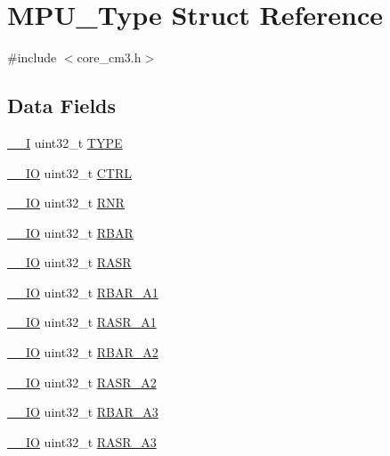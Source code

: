 \hypertarget{structMPU__Type}{}\section{M\+P\+U\+\_\+\+Type Struct Reference}
\label{structMPU__Type}


{\ttfamily \#include $<$core\+\_\+cm3.\+h$>$}

\subsection*{Data Fields}
\begin{DoxyCompactItemize}
\item 
\hyperlink{LPC17xx_8h_af63697ed9952cc71e1225efe205f6cd3}{\+\_\+\+\_\+I} uint32\+\_\+t \hyperlink{structMPU__Type_a6ae8a8c3a4909ae41447168d793608f7}{T\+Y\+PE}
\item 
\hyperlink{LPC17xx_8h_aec43007d9998a0a0e01faede4133d6be}{\+\_\+\+\_\+\+IO} uint32\+\_\+t \hyperlink{structMPU__Type_aab33593671948b93b1c0908d78779328}{C\+T\+RL}
\item 
\hyperlink{LPC17xx_8h_aec43007d9998a0a0e01faede4133d6be}{\+\_\+\+\_\+\+IO} uint32\+\_\+t \hyperlink{structMPU__Type_afd8de96a5d574c3953e2106e782f9833}{R\+NR}
\item 
\hyperlink{LPC17xx_8h_aec43007d9998a0a0e01faede4133d6be}{\+\_\+\+\_\+\+IO} uint32\+\_\+t \hyperlink{structMPU__Type_a3f2e2448a77aadacd9f394f6c4c708d9}{R\+B\+AR}
\item 
\hyperlink{LPC17xx_8h_aec43007d9998a0a0e01faede4133d6be}{\+\_\+\+\_\+\+IO} uint32\+\_\+t \hyperlink{structMPU__Type_adc65d266d15ce9ba57b3d127e8267f03}{R\+A\+SR}
\item 
\hyperlink{LPC17xx_8h_aec43007d9998a0a0e01faede4133d6be}{\+\_\+\+\_\+\+IO} uint32\+\_\+t \hyperlink{structMPU__Type_a4dbcffa0a71c31e521b645b34b40e639}{R\+B\+A\+R\+\_\+\+A1}
\item 
\hyperlink{LPC17xx_8h_aec43007d9998a0a0e01faede4133d6be}{\+\_\+\+\_\+\+IO} uint32\+\_\+t \hyperlink{structMPU__Type_a94222f9a8637b5329016e18f08af7185}{R\+A\+S\+R\+\_\+\+A1}
\item 
\hyperlink{LPC17xx_8h_aec43007d9998a0a0e01faede4133d6be}{\+\_\+\+\_\+\+IO} uint32\+\_\+t \hyperlink{structMPU__Type_a8703a00626dba046b841c0db6c78c395}{R\+B\+A\+R\+\_\+\+A2}
\item 
\hyperlink{LPC17xx_8h_aec43007d9998a0a0e01faede4133d6be}{\+\_\+\+\_\+\+IO} uint32\+\_\+t \hyperlink{structMPU__Type_a0aac7727a6225c6aa00627c36d51d014}{R\+A\+S\+R\+\_\+\+A2}
\item 
\hyperlink{LPC17xx_8h_aec43007d9998a0a0e01faede4133d6be}{\+\_\+\+\_\+\+IO} uint32\+\_\+t \hyperlink{structMPU__Type_a9fda17c37b85ef317c7c8688ff8c5804}{R\+B\+A\+R\+\_\+\+A3}
\item 
\hyperlink{LPC17xx_8h_aec43007d9998a0a0e01faede4133d6be}{\+\_\+\+\_\+\+IO} uint32\+\_\+t \hyperlink{structMPU__Type_aced0b908173b9a4bae4f59452f0cdb0d}{R\+A\+S\+R\+\_\+\+A3}
\end{DoxyCompactItemize}


